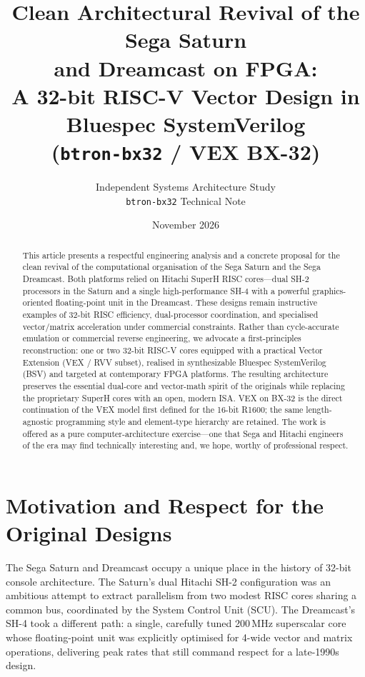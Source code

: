 \documentclass[11pt,a4paper]{article}
\title{\textbf{Clean Architectural Revival of the Sega Saturn\\
and Dreamcast on FPGA:\\
A 32-bit RISC-V Vector Design in Bluespec SystemVerilog\\
(\texttt{btron-bx32} / VEX BX-32)}}
\author{
  Independent Systems Architecture Study\\
  \texttt{btron-bx32} Technical Note
}
\date{November 2026}
\begin{document}
\maketitle

\begin{abstract}
This article presents a respectful engineering analysis and a concrete proposal for the clean revival of the computational organisation of the Sega Saturn and the Sega Dreamcast. Both platforms relied on Hitachi SuperH RISC cores---dual SH-2 processors in the Saturn and a single high-performance SH-4 with a powerful graphics-oriented floating-point unit in the Dreamcast. These designs remain instructive examples of 32-bit RISC efficiency, dual-processor coordination, and specialised vector/matrix acceleration under commercial constraints. Rather than cycle-accurate emulation or commercial reverse engineering, we advocate a first-principles reconstruction: one or two 32-bit RISC-V cores equipped with a practical Vector Extension (VEX / RVV subset), realised in synthesizable Bluespec SystemVerilog (BSV) and targeted at contemporary FPGA platforms. The resulting architecture preserves the essential dual-core and vector-math spirit of the originals while replacing the proprietary SuperH cores with an open, modern ISA. VEX on BX-32 is the direct continuation of the VEX model first defined for the 16-bit R1600; the same length-agnostic programming style and element-type hierarchy are retained. The work is offered as a pure computer-architecture exercise---one that Sega and Hitachi engineers of the era may find technically interesting and, we hope, worthy of professional respect.
\end{abstract}

\section{Motivation and Respect for the Original Designs}

The Sega Saturn and Dreamcast occupy a unique place in the history of 32-bit console architecture. The Saturn's dual Hitachi SH-2 configuration was an ambitious attempt to extract parallelism from two modest RISC cores sharing a common bus, coordinated by the System Control Unit (SCU). The Dreamcast's SH-4 took a different path: a single, carefully tuned 200\,MHz superscalar core whose floating-point unit was explicitly optimised for 4-wide vector and matrix operations, delivering peak rates that still command respect for a late-1990s design.
\end{document}
